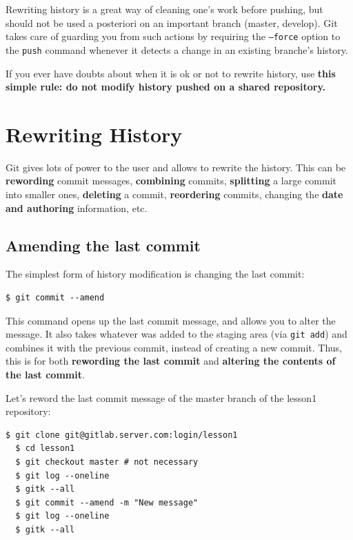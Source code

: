 \documentclass{../../common/tufte-latex/tufte-handout}
\begin{document}
Rewriting history is a great way of cleaning one's work before pushing, but should not be used a posteriori on an important branch (master, develop).  Git takes care of guarding you from such actions by requiring the \texttt{--force} option to the \texttt{push} command whenever it detects a change in an existing branche's history.

If you ever have doubts about when it is ok or not to rewrite history, use \textbf{this simple rule: do not modify history pushed on a shared repository.}

\section{Rewriting History}
Git gives lots of power to the user and allows to rewrite the history.
This can be \textbf{rewording} commit messages, \textbf{combining} commits, \textbf{splitting} a large commit into smaller ones, \textbf{deleting} a commit, \textbf{reordering} commits, changing the \textbf{date and authoring} information, etc.

\subsection{Amending the last commit}
The simplest form of history modification is changing the last commit:

\begin{lstlisting}[style=BashInputStyle]
  $ git commit --amend
\end{lstlisting}

This command opens up the last commit message, and allows you to alter the message.
It also takes whatever was added to the staging area (via \texttt{git add}) and combines it with the previous commit, instead of creating a new commit.
Thus, this is for both \textbf{rewording the last commit} and \textbf{altering the contents of the last commit}.

Let's reword the last commit message of the master branch of the lesson1 repository:

\begin{lstlisting}[style=BashInputStyle]
  $ git clone git@gitlab.server.com:login/lesson1
  $ cd lesson1
  $ git checkout master # not necessary
  $ git log --oneline
  $ gitk --all
  $ git commit --amend -m "New message"
  $ git log --oneline
  $ gitk --all
\end{lstlisting}
\end{document}
